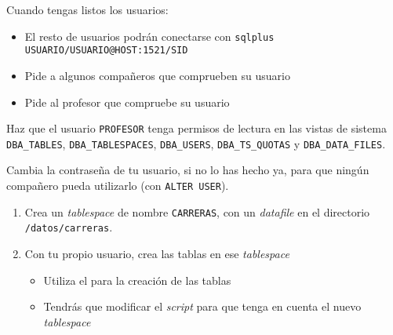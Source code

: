 \begin{homeworkProblem}
  Cuando tengas listos los usuarios:
  \begin{itemize}
    \item El resto de usuarios podrán conectarse con \texttt{sqlplus USUARIO/USUARIO@HOST:1521/SID}
    \item Pide a algunos compañeros que comprueben su usuario
    \item Pide al profesor que compruebe su usuario
  \end{itemize}
\end{homeworkProblem}

\begin{homeworkProblem}
  Haz que el usuario \texttt{PROFESOR} tenga permisos de lectura en las vistas de sistema \texttt{DBA\_TABLES}, \texttt{DBA\_TABLESPACES}, \texttt{DBA\_USERS}, \texttt{DBA\_TS\_QUOTAS} y \texttt{DBA\_DATA\_FILES}.
\end{homeworkProblem}

\begin{homeworkProblem}
  Cambia la contraseña de tu usuario, si no lo has hecho ya, para que ningún compañero pueda utilizarlo (con \texttt{ALTER USER}).

  \begin{enumerate}
  \item Crea un \textit{tablespace} de nombre \texttt{CARRERAS}, con un \textit{datafile} en el directorio \texttt{/datos/carreras}.
  \item Con tu propio usuario, crea las tablas en ese \textit{tablespace}
    \begin{itemize}
    \item Utiliza el  para la creación de las tablas
    \item Tendrás que modificar el \textit{script} para que tenga en cuenta el nuevo \textit{tablespace}
    \end{itemize}
  \end{enumerate}
\end{homeworkProblem}

